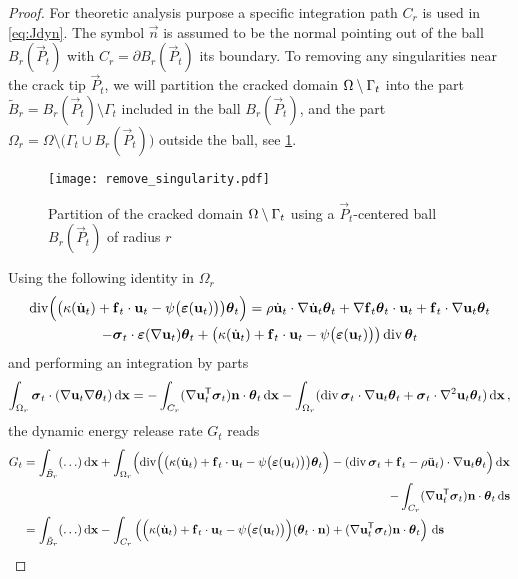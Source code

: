 \begin{proof}
For theoretic analysis purpose a specific integration path $C_r$ is used in \eqref{eq:Jdyn}. The symbol $\vec{n}$ is assumed to be the normal pointing out of the ball $B_r(\vec{P}_t)$ with $C_r=\partial B_r(\vec{P}_t)$ its boundary. To removing any singularities near the crack tip $\vec{P}_t$, we will partition the cracked domain ${\Omega\setminus\Gamma_t}$ into the part $\tilde{B}_r=B_r(\vec{P}_t)\setminus\Gamma_t$ included in the ball $B_r(\vec{P}_t)$, and the part $\Omega_r=\Omega\setminus\bigl(\Gamma_t\cup B_r(\vec{P}_t)\bigr)$ outside the ball, see \cref{fig:partition}.
\begin{figure}[htbp]
\centering
\texttt{[image: remove\_singularity.pdf]}
\caption{Partition of the cracked domain ${\Omega\setminus\Gamma_t}$ using a $\vec{P}_t$-centered ball $B_r(\vec{P}_t)$ of radius $r$} \label{fig:partition}
\end{figure}
Using the following identity in $\Omega_r$
\begin{multline} \label{eq:div}
\div\Bigl(\bigl(\kappa(\dot{\vec{u}}_t)+\vec{f}_t\cdot\vec{u}_t-\psi\bigl(\eps(\vec{u}_t)\bigr)\bigr)\vtheta_t\Bigr)=\rho\dot{\vec{u}}_t\cdot\nabla\dot{\vec{u}}_t\vtheta_t+\nabla\vec{f}_t\vtheta_t\cdot\vec{u}_t+\vec{f}_t\cdot\nabla\vec{u}_t\vtheta_t \\
-\sig_t\cdot\eps(\nabla\vec{u}_t)\vtheta_t+\bigl(\kappa(\dot{\vec{u}}_t)+\vec{f}_t\cdot\vec{u}_t-\psi\bigl(\eps(\vec{u}_t)\bigr)\bigr)\div\vtheta_t
\end{multline}
and performing an integration by parts
\begin{equation} \label{eq:signunt}
\int_{\Omega_r}\sig_t\cdot(\nabla\vec{u}_t\nabla\vtheta_t)\dx=-\int_{C_r}(\nabla\vec{u}_t^\mT\sig_t)\vec{n}\cdot\vtheta_t\dx-\int_{\Omega_r}(\div\sig_t\cdot\nabla\vec{u}_t\vtheta_t+\sig_t\cdot\nabla^2\vec{u}_t\vtheta_t)\dx\,,
\end{equation}
the dynamic energy release rate $G_t$ reads
\begin{align*}
G_t &= \int_{\tilde{B}_r}(\ldots)\dx+\int_{\Omega_r}\Bigl(\div\Bigl(\bigl(\kappa(\dot{\vec{u}}_t)+\vec{f}_t\cdot\vec{u}_t-\psi\bigl(\eps(\vec{u}_t)\bigr)\bigr)\vtheta_t\Bigr)-(\div\sig_t+\vec{f}_t-\rho\ddot{\vec{u}}_t)\cdot\nabla\vec{u}_t\vtheta_t\Bigr)\dx \\
&\pushright{-\int_{C_r}(\nabla\vec{u}_t^\mT\sig_t)\vec{n}\cdot\vtheta_t\ds} \\
&= \int_{\tilde{B}_r}(\ldots)\dx-\int_{C_r}\left(\Bigl(\kappa(\dot{\vec{u}}_t)+\vec{f}_t\cdot\vec{u}_t-\psi\bigl(\eps(\vec{u}_t)\bigr)\Bigr)(\vtheta_t\cdot\vec{n})+(\nabla\vec{u}_t^\mT\sig_t)\vec{n}\cdot\vtheta_t\right)\ds \\

\end{align*}
\end{proof}
